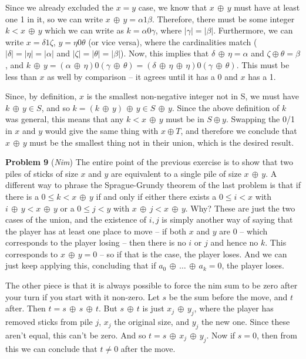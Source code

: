 Since we already excluded the $x = y$ case,
we know that $x \, \oplus \, y$ must have at least one 1 in it, so
we can write $x \, \oplus \, y = \alpha 1 \beta$.  Therefore, there must be
some integer $k < x \, \oplus \, y$ which we can write as
$k = \alpha 0 \gamma$, where $| \gamma | = | \beta |$.  Furthermore,
we can write $x = \delta 1 \zeta$, $y = \eta 0 \theta$ (or vice versa),
where the cardinalities match ($|\delta| = | \eta | = | \alpha |$
and  $|\zeta| = |\theta| = |\beta|$).  Now, this implies that $\delta \, \oplus \, \eta = \alpha$
and $\zeta \oplus \theta = \beta$, and $k \, \oplus \, y = \left(\alpha \, \oplus \, \eta\right)
0 \left(\gamma \, \oplus \, \theta\right) = \left(\delta \, \oplus \, \eta \, \oplus \, \eta\right)
0 \left(\gamma \, \oplus \, \theta\right)$.  This must be less than $x$ as well by
comparison -- it agrees until it has a 0 and $x$ has a 1.  

Since, by definition,
$x$ is the smallest non-negative integer not in S, we must have $k \, \oplus \, y \in S$,
and so $k  = \left(k \, \oplus \, y\right) \, \oplus \, y \in S \, \oplus \, y$.
Since the above definition of $k$ was general, this means that any $k < x \, \oplus \, y$
must be in $S \oplus y$.  Swapping the 0/1 in $x$ and $y$ would give the same
thing with $x \oplus T$, and therefore we conclude that $x \, \oplus \, y$
must be the smallest thing not in their union, which is the desired result.

\vskip 0.08in {\bf Problem 9} ({\it Nim}) \hfil\break
The entire point of the previous exercise is to show that two piles
of sticks of size $x$ and $y$ are equivalent to a single pile of size
$x \, \oplus \, y$.  A different way to phrase the Sprague-Grundy theorem
of the last problem is that if there is a $0 \le k < x \, \oplus \, y$
if and only if either there exists a $0 \le i < x$ with $i \, \oplus \, y < x \, \oplus \, y$
or a $0 \le j < y$ with $x \, \oplus \, j < x \, \oplus \, y$.  Why?  These
are just the two cases of the union, and the existence of $i, j$ is
simply another way of saying that the player has at least one place
to move -- if both $x$ and $y$ are 0 -- which corresponds to the
player losing -- then there is no $i$ or $j$ and hence no $k$.
This corresponds to $x \, \oplus \, y = 0$ -- so if that is the case,
the player loses.  And we can just keep applying this, concluding
that if $a_0 \, \oplus \, \ldots \, \oplus \, a_k = 0$, the player loses.

The other piece is that it is always possible to force the nim sum
to be zero after your turn if you start with it non-zero.  Let $s$
be the sum before the move, and $t$ after.  
Then $t = s \, \oplus \, s \, \oplus \, t$.  But $s \, \oplus \, t$
is just $x_j \, \oplus \, y_j$, where the player has removed
sticks from pile $j$, $x_j$ the original size, and $y_j$ the
new one.  Since these aren't equal, this can't be zero.  And
so $t = s \, \oplus \, x_j \, \oplus \, y_j$.  Now if $s = 0$,
then from this we can conclude that $t \ne 0$ after the move.

